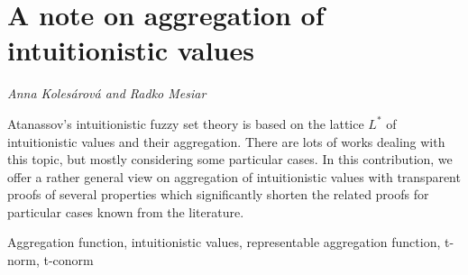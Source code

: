 \documentclass[../booklet.tex]{subfiles}
\begin{document}
\section[A note on aggregation of intuitionistic values. {\it Anna Kolesárová and Radko Mesiar}]{A note on aggregation of intuitionistic values}
 

\begin{center}
  {\it Anna Kolesárová and Radko Mesiar}
\end{center}

\vskip 0.8cm

 Atanassov's intuitionistic fuzzy set theory is based on the lattice $L^*$ of intuitionistic values and their aggregation. There are lots of
works dealing with this topic, but mostly considering some particular cases. In this contribution, we offer  a rather general view on aggregation of intuitionistic values with transparent proofs of several properties which significantly shorten the related proofs for particular cases known from the literature.


\noindent
\smallskip
{} Aggregation function, intuitionistic values, representable aggregation function, t-norm, t-conorm
\end{document}
